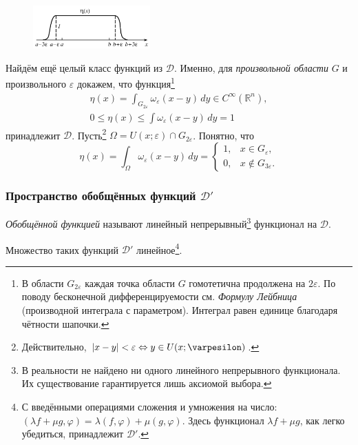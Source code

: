 \begin{figure}
  \centering
  \includegraphics[width=0.4\textwidth]{img/eta(x).png}
\end{figure}
Найдём ещё целый класс функций из $ \mathcal D $.
Именно, для \textsl{произвольной области} $ G $ и произвольного $ \varepsilon $
докажем, что функция\footnote{В области $ G_{2\varepsilon} $ каждая точка
области $ G $ гомотетична продолжена на $ 2\varepsilon $. По поводу бесконечной
дифференцируемости см.
\emph{Формулу Лейбница} (производной интеграла с параметром). Интеграл равен единице благодаря чётности шапочки.} 
\begin{gather*}
  \eta(x) = \int_{G_{2\varepsilon}} \omega_\varepsilon(x-y)\, dy \in
  C^\infty(\mathbb R^n),\\
  0 \leqslant \eta(x) \leqslant \int\omega_\varepsilon(x-y)\, dy = 1
\end{gather*}
принадлежит $ \mathcal D $. Пусть\footnote{ Действительно, $ |x - y|
 < \varepsilon \Leftrightarrow y \in U(x; \varpesilon) $.} $ \Omega = U(x; \varepsilon) \cap
G_{2\varepsilon}$.  Понятно, что  
\[
  \eta(x) = \int_{\Omega} \omega_\varepsilon(x - y)\, dy = \begin{cases}
    1, & x \in G_\varepsilon,\\
    0, & x\notin G_{3\varepsilon}.
  \end{cases}
\]

\subsubsection{Пространство обобщённых функций $ \mathcal D' $}
\emph{Обобщённой функцией} называют линейный непрерывный\footnote{В реальности
  не найдено ни одного линейного непрерывного функционала. Их существование
гарантируется лишь аксиомой выбора.} функционал на $
\mathcal D $. 

Множество таких функций $ \mathcal D' $ линейное\footnote{С введёнными
  операциями сложения и умножения на число: $ (\lambda f + \mu g,\varphi) =
\lambda(f,\varphi) + \mu(g,\varphi) $. Здесь функционал $ \lambda f + \mu g $,
как легко убедиться, принадлежит $ \mathcal D' $.}.

